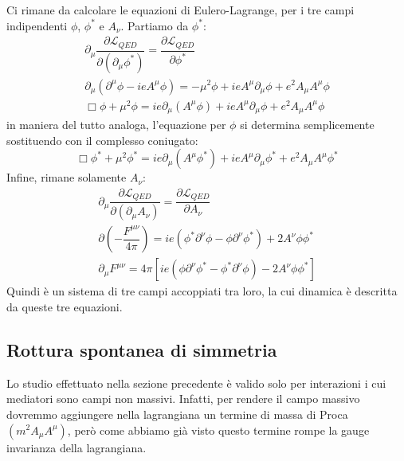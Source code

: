 Ci rimane da calcolare le equazioni di Eulero-Lagrange, per i tre campi indipendenti $\phi$, $\phi^*$ e $A_\nu$. Partiamo da $\phi^*$:
\begin{equation}
\begin{gathered}
      \partial_\mu\dfrac{\partial \mathcal{L}_{QED}}{\partial(\partial_\mu \phi^*)}=\dfrac{\partial\mathcal{L}_{QED}}{\partial \phi^*} \\
      \partial_\mu(\partial^\mu\phi-ieA^\mu\phi)=-\mu^2\phi+ieA^\mu\partial_\mu\phi+e^2A_\mu A^\mu\phi\\
      \Box\phi+\mu^2\phi=ie\partial_\mu(A^\mu\phi)+ieA^\mu\partial_\mu\phi+e^2A_\mu A^\mu\phi
\end{gathered}
\end{equation}
in maniera del tutto analoga, l'equazione per $\phi$ si determina semplicemente sostituendo con il complesso coniugato:
\begin{equation}
      \Box\phi^*+\mu^2\phi^*=ie\partial_\mu(A^\mu\phi^*)+ieA^\mu\partial_\mu\phi^*+e^2A_\mu A^\mu\phi^*
\end{equation}
Infine, rimane solamente $A_\nu$:
\begin{equation}
\begin{gathered}
    \partial_\mu\dfrac{\partial \mathcal{L}_{QED}}{\partial(\partial_\mu A_\nu)}=\dfrac{\partial\mathcal{L}_{QED}}{\partial A_\nu}\\
    \partial\left(-\dfrac{F^{\mu\nu}}{4\pi}\right)=ie(\phi^*\partial^\nu\phi-\phi\partial^\nu\phi^*)+2A^\nu\phi\phi^*\\
    \partial_\mu F^{\mu\nu}=4\pi[ie(\phi\partial^\nu\phi^*-\phi^*\partial^\nu\phi)-2A^\nu\phi\phi^*]
\end{gathered}
\end{equation}
Quindi è un sistema di tre campi accoppiati tra loro, la cui dinamica è descritta da queste tre equazioni.

\subsection{Rottura spontanea di simmetria}
Lo studio effettuato nella sezione precedente è valido solo per interazioni i cui mediatori sono campi non massivi. Infatti, per rendere il campo massivo dovremmo aggiungere nella lagrangiana un termine di massa di Proca $(m^2A_\mu A^\mu)$, però come abbiamo già visto questo termine rompe la gauge invarianza della lagrangiana.

